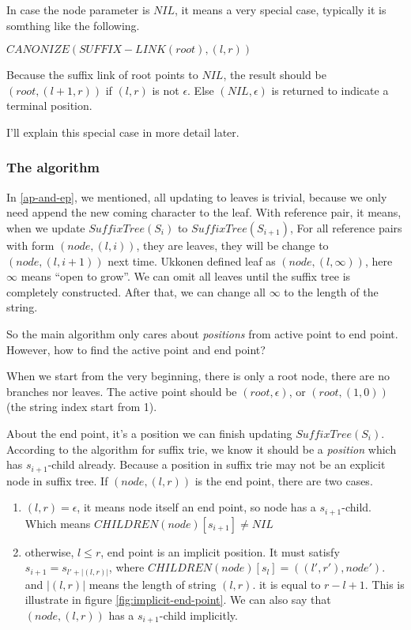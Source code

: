 \documentclass{article}
\begin{document}
In case the node parameter is $NIL$, it means a very special case, typically it is somthing
like the following.

$CANONIZE(SUFFIX-LINK(root), (l, r))$

Because the suffix link of root points to $NIL$, the result should be $(root, (l+1, r))$
if $(l, r)$ is not $\epsilon$. Else $(NIL, \epsilon)$ is returned to indicate
a terminal position.

I'll explain this special case in more detail later.

\subsubsection{The algorithm}

In \ref{ap-and-ep}, we mentioned, all updating to leaves is trivial, because we
only need append the new coming character to the leaf. With reference pair,
it means, when we update $SuffixTree(S_i)$ to $SuffixTree(S_{i+1})$, 
For all reference pairs with form $(node, (l, i))$, they are leaves, they will
be change to $(node, (l, i+1))$ next time. Ukkonen defined leaf as
$(node, (l, \infty))$, here $\infty$ means ``open to grow''. We can omit all 
leaves until the suffix tree is completely constructed. After that, we can 
change all $\infty$ to the length of the string.

So the main algorithm only cares about {\em positions} from active point
to end point. However, how to find the active point and end point?

When we start from the very beginning, there is only a root node, there are
no branches nor leaves. The active point should be $(root, \epsilon)$, or
$(root, (1, 0))$ (the string index start from 1).

About the end point, it's a position we can finish updating $SuffixTree(S_i)$.
According to the algorithm for suffix trie, we know it should be a
{\em position} which has $s_{i+1}$-child already. Because a position
in suffix trie may not be an explicit node in suffix tree. If $(node, (l, r))$
is the end point, there are two cases.

\begin{enumerate}
\item $(l, r)=\epsilon$, it means node itself an end point, so node has a 
$s_{i+1}$-child. Which means $CHILDREN(node)[s_{i+1}] \ne NIL$
\item otherwise, $l \leq r$, end point is an implicit position. 
It must satisfy $s_{i+1}=s_{l'+|(l, r)|}$, where $CHILDREN(node)[s_l]=((l', r'), node')$.
and $|(l, r)|$ means the length of string $(l, r)$. it is equal to $r-l+1$.
This is illustrate in figure \ref{fig:implicit-end-point}. We can
also say that $(node, (l, r))$ has a $s_{i+1}$-child implicitly.
\end{enumerate}
\end{document}
